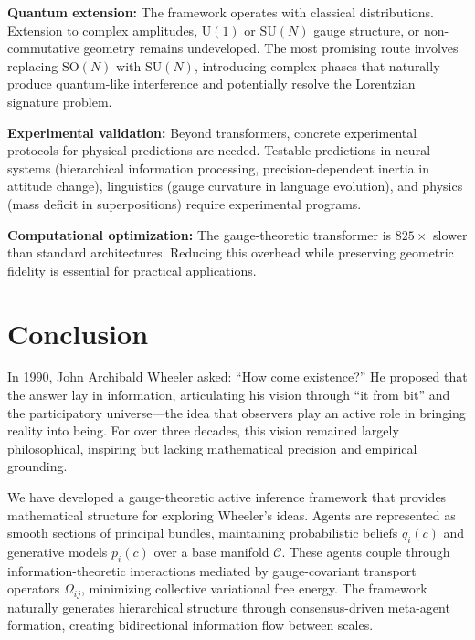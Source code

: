 \documentclass[11pt]{article}
\begin{document}
\textbf{Quantum extension:} The framework operates with classical distributions. Extension to complex amplitudes, $\mathrm{U}(1)$ or $\mathrm{SU}(N)$ gauge structure, or non-commutative geometry remains undeveloped. The most promising route involves replacing $\mathrm{SO}(N)$ with $\mathrm{SU}(N)$, introducing complex phases that naturally produce quantum-like interference and potentially resolve the Lorentzian signature problem.

\textbf{Experimental validation:} Beyond transformers, concrete experimental protocols for physical predictions are needed. Testable predictions in neural systems (hierarchical information processing, precision-dependent inertia in attitude change), linguistics (gauge curvature in language evolution), and physics (mass deficit in superpositions) require experimental programs.

\textbf{Computational optimization:} The gauge-theoretic transformer is $825\times$ slower than standard architectures. Reducing this overhead while preserving geometric fidelity is essential for practical applications.

\section{Conclusion}
\label{sec:conclusion}

In 1990, John Archibald Wheeler asked: ``How come existence?'' He proposed that the answer lay in information, articulating his vision through ``it from bit'' and the participatory universe---the idea that observers play an active role in bringing reality into being. For over three decades, this vision remained largely philosophical, inspiring but lacking mathematical precision and empirical grounding.

We have developed a gauge-theoretic active inference framework that provides mathematical structure for exploring Wheeler's ideas. Agents are represented as smooth sections of principal bundles, maintaining probabilistic beliefs $q_i(c)$ and generative models $p_i(c)$ over a base manifold $\mathcal{C}$. These agents couple through information-theoretic interactions mediated by gauge-covariant transport operators $\Omega_{ij}$, minimizing collective variational free energy. The framework naturally generates hierarchical structure through consensus-driven meta-agent formation, creating bidirectional information flow between scales.
\end{document}
